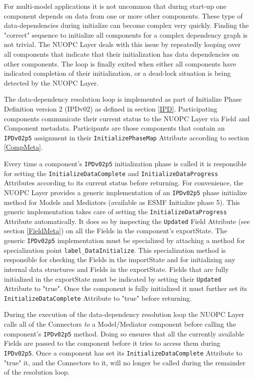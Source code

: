 %

\label{DataDepInit}

For multi-model applications it is not uncommon that during start-up one component depends on data from one or more other components. These type of data-dependencies during initialize can become complex very quickly. Finding the "correct" sequence to initialize all components for a complex dependency graph is not trivial. The NUOPC Layer deals with this issue by repeatedly looping over all components that indicate that their initialization has data dependencies on other components. The loop is finally exited when either all components have indicated completion of their initialization, or a dead-lock situation is being detected by the NUOPC Layer.

The data-dependency resolution loop is implemented as part of Initialize Phase Definition version 2 (IPDv02) as defined in section \ref{IPD}. Participating components communicate their current status to the NUOPC Layer via Field and Component metadata. Participants are those components that contain an {\tt IPDv02p5} assignment in their {\tt InitializePhaseMap} Attribute according to section \ref{CompMeta}.  

Every time a component's {\tt IPDv02p5} initialization phase is called it is responsible for setting the {\tt InitializeDataComplete} and {\tt InitializeDataProgress} Attributes according to its current status before returning. For convenience, the NUOPC Layer provides a generic implementation of an {\tt IPDv02p5} phase initialize method for Models and Mediators (available as ESMF Initialize phase 5). This generic implementation takes care of setting the {\tt InitializeDataProgress} Attribute automatically. It does so by inspecting the {\tt Updated} Field Attribute (see section \ref{FieldMeta}) on all the Fields in the component's exportState. The generic {\tt IPDv02p5} implementation must be specialized by attaching a method for specialization point {\tt label\_DataInitialize}. This specialization method is responsible for checking the Fields in the importState and for initializing any internal data structures and Fields in the exportState. Fields that are fully initialized in the exportState must be indicated by setting their {\tt Updated} Attribute to "true". Once the component is fully initialized it must further set its {\tt InitializeDataComplete} Attribute to "true" before returning.

During the execution of the data-dependency resolution loop the NUOPC Layer calls all of the Connectors {\em to} a Model/Mediator component before calling the component's {\tt IPDv02p5} method. Doing so ensures that all the currently available Fields are passed to the component before it tries to access them during {\tt IPDv02p5}. Once a component has set its {\tt InitializeDataComplete} Attribute to "true" it, and the Connectors to it, will no longer be called during the remainder of the resolution loop. 

